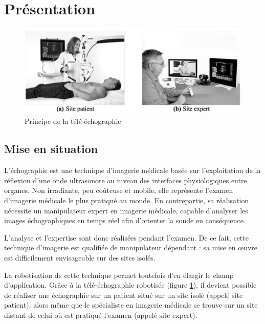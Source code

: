 

\section{Présentation}

\begin{figure}[ht!]
\begin{center}
 \includegraphics[width=0.9\linewidth]{img/fig01}
\end{center}
\caption{Principe de la télé-échographie}
\label{fig01}
\end{figure}

\subsection{Mise en situation}

L’échographie est une technique d’imagerie médicale basée sur l’exploitation de la réflexion d’une onde ultrasonore au niveau des interfaces physiologiques entre organes. Non irradiante, peu coûteuse et mobile, elle représente l’examen d’imagerie médicale le plus pratiqué au monde. En contrepartie, sa réalisation nécessite un manipulateur expert en imagerie médicale, capable d’analyser les images échographiques en temps réel afin d’orienter la sonde en conséquence. 

L’analyse et l’expertise sont donc réalisées pendant l’examen. De ce fait, cette technique d’imagerie est qualifiée de \og manipulateur dépendant \fg : sa mise en \oe uvre est difficilement envisageable sur des sites isolés. 

La robotisation de cette technique permet toutefois d'en élargir le champ d'application. Grâce à la télé-échographie robotisée (figure \ref{fig01}), il devient possible de réaliser une échographie sur un patient situé sur un site isolé (appelé site patient), alors même que le spécialiste en imagerie médicale se trouve sur un site distant de celui où est pratiqué l'examen (appelé site expert). 

